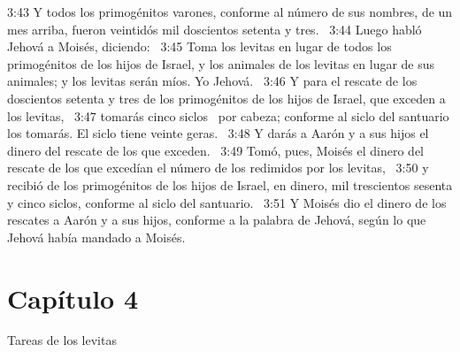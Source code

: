 3:43 Y todos los primogénitos varones, conforme al número de sus nombres, de un mes arriba, fueron veintidós mil doscientos setenta y tres.  
3:44 Luego habló Jehová a Moisés, diciendo:  
3:45 Toma los levitas en lugar de todos los primogénitos de los hijos de Israel, y los animales de los levitas en lugar de sus animales; y los levitas serán míos. Yo Jehová.  
3:46 Y para el rescate de los doscientos setenta y tres de los primogénitos de los hijos de Israel, que exceden a los levitas,  
3:47 tomarás cinco siclos  por cabeza; conforme al siclo del santuario los tomarás. El siclo tiene veinte geras.  
3:48 Y darás a Aarón y a sus hijos el dinero del rescate de los que exceden.  
3:49 Tomó, pues, Moisés el dinero del rescate de los que excedían el número de los redimidos por los levitas,  
3:50 y recibió de los primogénitos de los hijos de Israel, en dinero, mil trescientos sesenta y cinco siclos, conforme al siclo del santuario.  
3:51 Y Moisés dio el dinero de los rescates a Aarón y a sus hijos, conforme a la palabra de Jehová, según lo que Jehová había mandado a Moisés.  
\section*{Capítulo 4 }
Tareas de los levitas 


